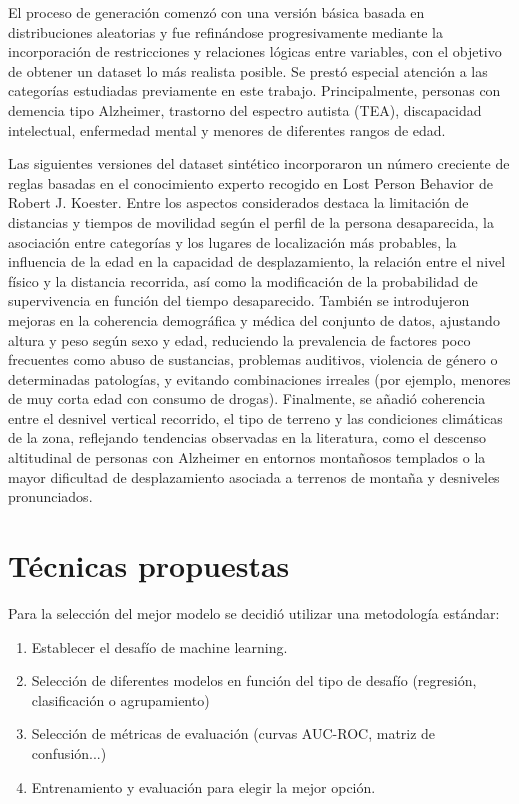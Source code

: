El proceso de generación comenzó con una versión básica basada en distribuciones aleatorias y fue refinándose progresivamente mediante la incorporación de restricciones y relaciones lógicas entre variables, con el objetivo de obtener un dataset lo más realista posible. Se prestó especial atención a las categorías estudiadas previamente en este trabajo. Principalmente, personas con demencia tipo Alzheimer, trastorno del espectro autista (TEA), discapacidad intelectual, enfermedad mental y menores de diferentes rangos de edad.

Las siguientes versiones del dataset sintético incorporaron un número creciente de reglas basadas en el conocimiento experto recogido en Lost Person Behavior de Robert J. Koester\cite{libroLostPersonBehavior}. Entre los aspectos considerados destaca la limitación de distancias y tiempos de movilidad según el perfil de la persona desaparecida, la asociación entre categorías y los lugares de localización más probables, la influencia de la edad en la capacidad de desplazamiento, la relación entre el nivel físico y la distancia recorrida, así como la modificación de la probabilidad de supervivencia en función del tiempo desaparecido. También se introdujeron mejoras en la coherencia demográfica y médica del conjunto de datos, ajustando altura y peso según sexo y edad, reduciendo la prevalencia de factores poco frecuentes como abuso de sustancias, problemas auditivos, violencia de género o determinadas patologías, y evitando combinaciones irreales (por ejemplo, menores de muy corta edad con consumo de drogas). Finalmente, se añadió coherencia entre el desnivel vertical recorrido, el tipo de terreno y las condiciones climáticas de la zona, reflejando tendencias observadas en la literatura, como el descenso altitudinal de personas con Alzheimer en entornos montañosos templados o la mayor dificultad de desplazamiento asociada a terrenos de montaña y desniveles pronunciados.

\section{Técnicas propuestas}
Para la selección del mejor modelo se decidió utilizar una metodología estándar\cite{ibm_model_selection}: 

\begin{enumerate}
    \item Establecer el desafío de machine learning.
    \item Selección de diferentes modelos en función del tipo de desafío (regresión, clasificación o agrupamiento)
    \item Selección de métricas de evaluación (curvas AUC-ROC, matriz de confusión...)
    \item Entrenamiento y evaluación para elegir la mejor opción. 
\end{enumerate}

